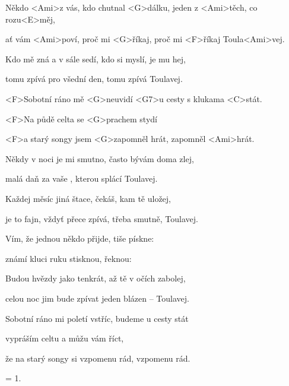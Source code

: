

\zs
Někdo <Ami>z vás, kdo chutnal <G>dálku, jeden z <Ami>těch, co rozu<E>měj,

ať vám <Ami>poví, proč mi <G>říkaj, proč mi <F>říkaj Toula<Ami>vej.
\ks

\zs
Kdo mě zná a v sále sedí, kdo si myslí, je mu hej,

tomu zpívá pro všední den, tomu zpívá Toulavej.
\ks

\zr
<F>Sobotní ráno mě <G>neuvidí <G7>u cesty s klukama <C>stát.

<F>Na půdě celta se <G>prachem stydí

<F>a starý songy jsem <G>zapomněl hrát, zapomněl <Ami>hrát.
\kr

\zs
Někdy v noci je mi smutno, často bývám doma zlej,

malá daň za vaše , kterou splácí Toulavej.
\ks

\zs
Každej měsíc jiná štace, čekáš, kam tě uložej,

je to fajn, vždyť přece zpívá, třeba smutně, Toulavej.
\ks

\zr\kr

\zs
Vím, že jednou někdo přijde, tiše pískne: 

známí kluci ruku stisknou, řeknou: 
\ks

\zs
Budou hvězdy jako tenkrát, až tě v očích zabolej,

celou noc jim bude zpívat jeden blázen – Toulavej.
\ks

\zr
Sobotní ráno mi poletí vstříc, budeme u cesty stát

vypráším celtu a můžu vám říct,

že na starý songy si vzpomenu rád, vzpomenu rád.
\kr

\zs = 1. \ks

\kp
